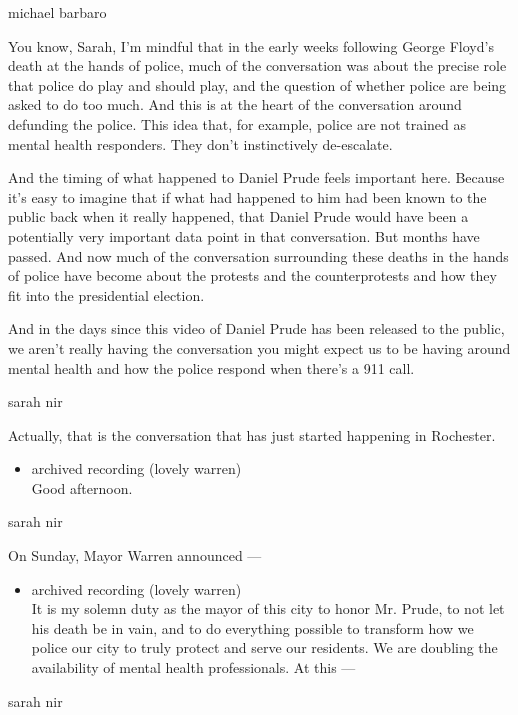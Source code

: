 michael barbaro

You know, Sarah, I'm mindful that in the early weeks following George
Floyd's death at the hands of police, much of the conversation was about
the precise role that police do play and should play, and the question
of whether police are being asked to do too much. And this is at the
heart of the conversation around defunding the police. This idea that,
for example, police are not trained as mental health responders. They
don't instinctively de-escalate.

And the timing of what happened to Daniel Prude feels important here.
Because it's easy to imagine that if what had happened to him had been
known to the public back when it really happened, that Daniel Prude
would have been a potentially very important data point in that
conversation. But months have passed. And now much of the conversation
surrounding these deaths in the hands of police have become about the
protests and the counterprotests and how they fit into the presidential
election.

And in the days since this video of Daniel Prude has been released to
the public, we aren't really having the conversation you might expect us
to be having around mental health and how the police respond when
there's a 911 call.

sarah nir

Actually, that is the conversation that has just started happening in
Rochester.

\begin{itemize}
\tightlist
\item
  archived recording (lovely warren)\\
  Good afternoon.
\end{itemize}

sarah nir

On Sunday, Mayor Warren announced ---

\begin{itemize}
\tightlist
\item
  archived recording (lovely warren)\\
  It is my solemn duty as the mayor of this city to honor Mr. Prude, to
  not let his death be in vain, and to do everything possible to
  transform how we police our city to truly protect and serve our
  residents. We are doubling the availability of mental health
  professionals. At this ---
\end{itemize}

sarah nir

